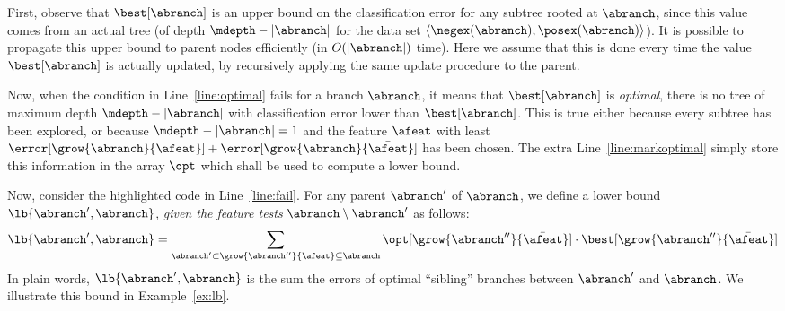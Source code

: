 \documentclass{llncs}
\begin{document}




First, observe that $\best[\abranch]$ is an upper bound on the classification error for any subtree rooted at $\abranch$, since this value comes from an actual tree (of depth $\mdepth - |\abranch|$ for the data set $\langle \negex(\abranch),\posex(\abranch) \rangle$). It is possible to propagate this upper bound to parent nodes efficiently (in $O(|\abranch|)$ time). Here we assume that this is done every time the value $\best[\abranch]$ is actually updated, by recursively applying the same update procedure to the parent.


Now, when the condition in Line~\ref{line:optimal} fails for a branch $\abranch$, it means that $\best[\abranch]$ is \emph{optimal}, there is no tree of maximum depth $\mdepth - |\abranch|$ with classification error lower than $\best[\abranch]$. This is true either because every subtree has been explored, or because $\mdepth - |\abranch| = 1$ and the feature $\afeat$ with least 
$\error[\grow{\abranch}{\afeat}] + \error[\grow{\abranch}{\bar{\afeat}}]$
has been chosen. The extra Line~\ref{line:markoptimal} simply store this information in the array $\opt$ which shall be used to compute a lower bound.



Now, consider the highlighted code in Line~\ref{line:fail}.
For any parent $\abranch'$ of $\abranch$, we define a lower bound $\lb{\abranch',\abranch}$, \emph{given the feature tests} $\abranch \setminus \abranch'$ as follows:
$$
\lb{\abranch',\abranch} = \sum\limits_{\abranch' \subset \grow{\abranch''}{\afeat} \subseteq \abranch}\opt[\grow{\abranch''}{\bar{\afeat}}] \cdot \best[\grow{\abranch''}{\bar{\afeat}}]
$$
In plain words, $\lb{\abranch',\abranch}$ is the sum the errors of optimal ``sibling'' branches between $\abranch'$ and $\abranch$. We illustrate this bound in Example~\ref{ex:lb}.
\end{document}
